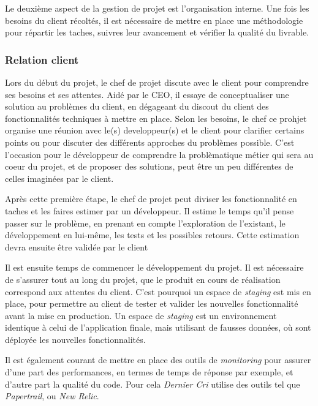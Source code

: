 \documentclass[12pt,a4paper]{article}
\begin{document}
  Le deuxième aspect de la gestion de projet est l'organisation interne.
  Une fois les besoins du client récoltés, il est nécessaire de mettre en
  place une méthodologie pour répartir les taches, suivres leur avancement
  et vérifier la qualité du livrable.

  \bigskip

  \subsubsection{Relation client}\label{relation-client}

  \bigskip

  Lors du début du projet, le chef de projet discute avec le client pour
  comprendre ses besoins et ses attentes. Aidé par le CEO, il essaye de
  conceptualiser une solution au problèmes du client, en dégageant du
  discout du client des fonctionnalités techniques à mettre en place.
  Selon les besoins, le chef ce prohjet organise une réunion avec le(s)
  developpeur(s) et le client pour clarifier certains points ou pour
  discuter des différents approches du problèmes possible. C'est
  l'occasion pour le développeur de comprendre la problèmatique métier qui
  sera au coeur du projet, et de proposer des solutions, peut être un peu
  différentes de celles imaginées par le client.

  \bigskip

  Après cette première étape, le chef de projet peut diviser les
  fonctionnalité en taches et les faires estimer par un développeur. Il
  estime le temps qu'il pense passer sur le problème, en prenant en compte
  l'exploration de l'existant, le développement en lui-même, les tests et
  les possibles retours. Cette estimation devra ensuite être validée par
  le client

  \bigskip

  Il est ensuite temps de commencer le développement du projet. Il est
  nécessaire de s'assurer tout au long du projet, que le produit en cours
  de réalisation correspond aux attentes du client. C'est pourquoi un
  espace de \emph{staging} est mis en place, pour permettre au client de
  tester et valider les nouvelles fonctionnalité avant la mise en
  production. Un espace de \emph{staging} est un environnement identique à
  celui de l'application finale, mais utilisant de fausses données, où
  sont déployée les nouvelles fonctionnalités.

  \bigskip

  Il est également courant de mettre en place des outils de
  \emph{monitoring} pour assurer d'une part des performances, en termes de
  temps de réponse par exemple, et d'autre part la qualité du code. Pour
  cela \emph{Dernier Cri} utilise des outils tel que \emph{Papertrail}, ou
  \emph{New Relic}.
\end{document}
